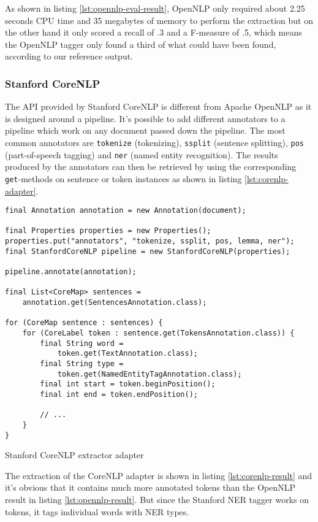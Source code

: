As shown in listing \ref{lst:opennlp-eval-result}, OpenNLP only required about 2.25 seconds CPU time and 35 megabytes of memory to perform the extraction but on the other hand it only scored a recall of .3 and a F-measure of .5, which means the OpenNLP tagger only found a third of what could have been found, according to our reference output.

\subsubsection{Stanford CoreNLP}
The \gls{API} provided by Stanford CoreNLP is different from Apache OpenNLP as it is designed around a pipeline. It's possible to add different annotators to a pipeline which work on any document passed down the pipeline. The most common annotators are \texttt{tokenize} (tokenizing), \texttt{ssplit} (sentence splitting), \texttt{pos} (part-of-speech tagging) and \texttt{ner} (named entity recognition). The results produced by the annotators can then be retrieved by using the corresponding \texttt{get}-methods on sentence or token instances as shown in listing \ref{lst:corenlp-adapter}.

\begin{listing}[H]
\begin{verbatim}
final Annotation annotation = new Annotation(document);

final Properties properties = new Properties();
properties.put("annotators", "tokenize, ssplit, pos, lemma, ner");
final StanfordCoreNLP pipeline = new StanfordCoreNLP(properties);

pipeline.annotate(annotation);

final List<CoreMap> sentences = 
    annotation.get(SentencesAnnotation.class);

for (CoreMap sentence : sentences) {
    for (CoreLabel token : sentence.get(TokensAnnotation.class)) {
        final String word = 
            token.get(TextAnnotation.class);
        final String type = 
            token.get(NamedEntityTagAnnotation.class);
        final int start = token.beginPosition();
        final int end = token.endPosition();

        // ...
    }
}
\end{verbatim}
\caption{Stanford CoreNLP extractor adapter}
\label{lst:corenlp-adapter}
\end{listing}

The extraction of the CoreNLP adapter is shown in listing \ref{lst:corenlp-result} and it's obvious that it contains much more annotated tokens than the OpenNLP result in listing \ref{lst:opennlp-result}. But since the Stanford \gls{NER} tagger works on tokens, it tags individual words with \gls{NER} types.


